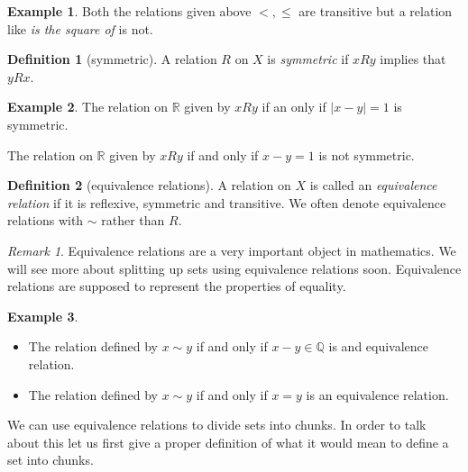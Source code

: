 \documentclass[
]{book}
\theoremstyle{definition}
\newtheorem{definition}{Definition}[chapter]
\theoremstyle{definition}
\newtheorem{example}{Example}[chapter]
\theoremstyle{definition}
\theoremstyle{definition}
\theoremstyle{remark}
\newtheorem*{remark}{Remark}
\begin{document}
\begin{example}
Both the relations given above \(<,\leq\) are transitive but a relation like \emph{is the square of} is not.
\end{example}

\begin{definition}[symmetric]
A relation \(R\) on \(X\) is \emph{symmetric} if \(x R y\) implies that \(y R x\).
\end{definition}

\begin{example}
The relation on \(\mathbb{R}\) given by \(xR y\) if an only if \(|x-y|=1\) is symmetric.

The relation on \(\mathbb{R}\) given by \(x R y\) if and only if \(x-y=1\) is not symmetric.
\end{example}

\begin{definition}[equivalence relations]
A relation on \(X\) is called an \emph{equivalence relation} if it is reflexive, symmetric and transitive. We often denote equivalence relations with \(\sim\) rather than \(R\).
\end{definition}

\begin{remark}
Equivalence relations are a very important object in mathematics. We will see more about splitting up sets using equivalence relations soon. Equivalence relations are supposed to represent the properties of equality.
\end{remark}

\begin{example}

\begin{itemize}
\item
  The relation defined by \(x \sim y\) if and only if \(x-y \in \mathbb{Q}\) is and equivalence relation.
\item
  The relation defined by \(x \sim y\) if and only if \(x=y\) is an equivalence relation.
\end{itemize}

\end{example}

We can use equivalence relations to divide sets into chunks. In order to talk about this let us first give a proper definition of what it would mean to define a set into chunks.
\end{document}
